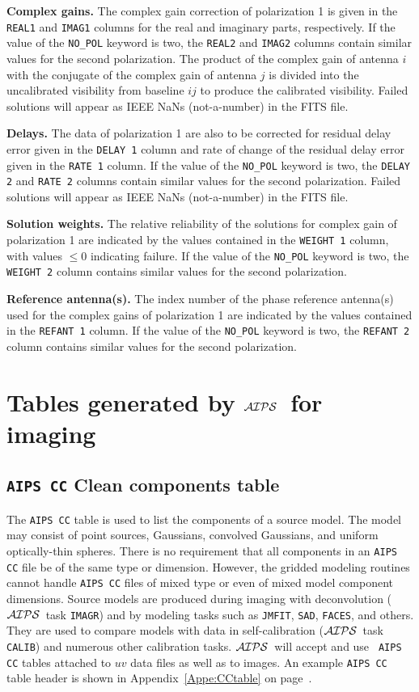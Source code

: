 \documentclass[twoside]{article}
\newcommand{\AIPS}{{$\cal AIPS\/$}}
\begin{document}
{\bf Complex gains.} The complex gain correction of polarization 1 is
given in the {\tt REAL1} and {\tt IMAG1} columns for the real and
imaginary parts, respectively.  If the value of the {\tt NO\_POL}
keyword is two, the {\tt REAL2} and {\tt IMAG2} columns contain
similar values for the second polarization.  The product of the
complex gain of antenna $i$ with the conjugate of the complex gain of
antenna $j$ is divided into the uncalibrated visibility from baseline
$ij$ to produce the calibrated visibility.  Failed solutions will
appear as IEEE NaNs (not-a-number) in the FITS file.

{\bf Delays.} The data of polarization 1 are also to be corrected for
residual delay error given in the {\tt DELAY 1} column and rate of
change of the residual delay error given in the {\tt RATE 1} column.
If the value of the {\tt NO\_POL} keyword is two, the {\tt DELAY 2}
and {\tt RATE 2} columns contain similar values for the second
polarization.  Failed solutions will appear as IEEE NaNs
(not-a-number) in the FITS file.

{\bf Solution weights.} The relative reliability of the solutions for
complex gain of polarization 1 are indicated by the values contained
in the {\tt WEIGHT 1} column, with values $\leq 0$ indicating failure.
If the value of the {\tt NO\_POL} keyword is two, the {\tt WEIGHT 2}
column contains similar values for the second polarization.

{\bf Reference antenna(s).} The index number of the phase reference
antenna(s) used for the complex gains of polarization 1 are indicated
by the values contained in the {\tt REFANT 1} column.  If the value of
the {\tt NO\_POL} keyword is two, the {\tt REFANT 2} column contains
similar values for the second polarization.

\section{Tables generated by \AIPS\ for imaging}
\label{s:image}

\subsection{{\tt AIPS CC} Clean components table}
\label{s:CC}

The {\tt AIPS CC} table is used to list the components of a source
model.  The model may consist of point sources, Gaussians, convolved
Gaussians, and uniform optically-thin spheres.  There is no
requirement that all components in an {\tt AIPS CC} file be of the
same type or dimension.  However, the gridded modeling routines cannot
handle {\tt AIPS CC} files of mixed type or even of mixed model
component dimensions.  Source models are produced during imaging with
deconvolution (\AIPS\ task {\tt IMAGR}) and by modeling tasks such as
{\tt JMFIT}, {\tt SAD}, {\tt FACES}, and others.  They are used to
compare models with data in self-calibration (\AIPS\ task {\tt CALIB})
and numerous other calibration tasks.  \AIPS\ will accept and use {\tt
AIPS CC} tables attached to $uv$ data files as well as to images.  An
example {\tt AIPS CC} table header is shown in
Appendix~\ref{Appe:CCtable} on page~\pageref{Appe:CCtable}.
\end{document}
